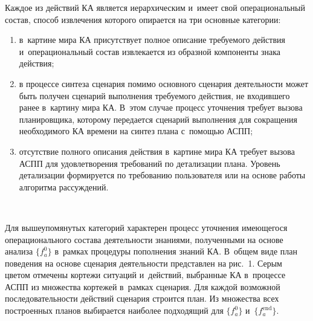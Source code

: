 \begin{multicols}{2}
  Каждое из действий КА является иерархическим и~имеет свой 
операциональный со\-став, способ извлечения которого опирается 
на три основные категории:
  \begin{enumerate}[(1)]
\item в~картине мира КА присутствует полное описание требуемого действия 
и~операциональный состав извлекается из образной компоненты знака действия;
  \item в процессе синтеза сценария помимо основного сценария дея\-тель\-ности 
может быть получен сценарий выполнения требуемого действия, не 
входившего ранее в~картину мира КА. В~этом случае процесс уточ\-не\-ния 
требует вызова планировщика, которому передается сценарий выполнения для 
сокращения необходимого КА времени на синтез плана с~по\-мощью АСПП;
  \item отсутствие полного описания действия в~картине мира КА требует 
вызова АСПП для удовле\-тво\-ре\-ния требований по детализации плана. Уровень 
детализации формируется по требованию пользователя или на основе работы 
алгоритма рас\-суж\-де\-ний.
  \end{enumerate}
  
  \begin{figure*} %
  \vspace*{1pt}
  \begin{center}  
    \mbox{%
\epsfxsize=121.467mm
}

\end{center}
\vspace*{-2pt}

  \vspace*{-3pt}
  \end{figure*}
  
  Для вышеупомянутых категорий характерен процесс уточнения имеющегося 
операционального со\-ста\-ва деятельности знаниями, полученными на основе 
анализа $\{f_a^0\}$ в~рамках процедуры пополнения знаний КА. В~общем виде 
план поведения на основе сценария де\-ятель\-ности пред\-став\-лен на рис.~1. Серым 
цветом отмечены кортежи ситуаций и~действий, выбранные КА в~процессе 
АСПП из множества кортежей в~рам\-ках сценария. Для каждой возможной 
по\-сле\-до\-ва\-тель\-ности действий сценария строится план. Из множества всех 
по\-стро\-ен\-ных планов выбирается наиболее подходящий для $\{ f_a^0\}$ 
и~$\{f_a^{\mathrm{end}}\}$.
  

\end{multicols}
